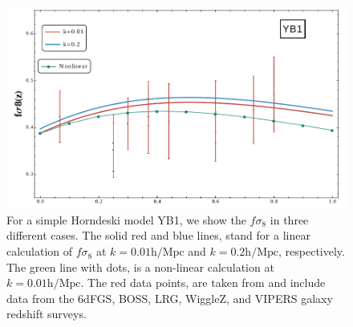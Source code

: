 \begin{figure}[tbph]
	\centering
	\includegraphics[width=0.7\linewidth]{Chapters/resummation-plots/fsigma8plot-preliminary-YB1.png}
	\caption[$f \sigma_{8}$ in Horndeski.]{For a simple Horndeski model YB1,
		 we show the $f \sigma_{8}$ in three different cases. The solid red and blue lines, stand for a linear calculation of $f \sigma_{8}$ 
		 at $k=0.01 \mathrm{h/Mpc}$ and 
		$k=0.2 \mathrm{h/Mpc}$, respectively. The green line with dots, is a non-linear calculation at  $k=0.01 \mathrm{h/Mpc}$. The red data points,
	are taken from \cite{macaulay2013lower} and include data from the 
	6dFGS, BOSS, LRG, WiggleZ, and VIPERS galaxy redshift surveys.}
	\label{fig:change-fsigma8-Y}
\end{figure}

